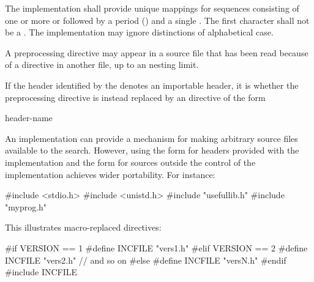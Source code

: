 \documentclass{wg21}
\newcommand{\clb}[1]{\removed{#1} \added{\grammarterm{line-break}}}
\begin{document}
\pnum
The implementation shall provide unique mappings for
sequences consisting of one or more
 or 
followed by a period
()
and a single
.
The first character shall not be a .
The implementation may ignore distinctions of alphabetical case.

\pnum
A
preprocessing directive may appear
in a source file that has been read because of a
directive in another file,
up to an  nesting limit.

\pnum
If the header identified by the 
denotes an importable header,
it is
whether the  preprocessing directive
is instead replaced by an  directive of the form
\begin{ncbnf}
     header-name \terminal{;} \clb{new-line}
\end{ncbnf}

\pnum
\begin{note}
    An implementation can provide a mechanism for making arbitrary
    source files available to the \tcode{< >} search.
    However, using the \tcode{< >} form for headers provided
    with the implementation and the  form for sources
    outside the control of the implementation
    achieves wider portability. For instance:
    
    \begin{codeblock}
        #include <stdio.h>
        #include <unistd.h>
        #include "usefullib.h"
        #include "myprog.h"
    \end{codeblock}
    
\end{note}

\pnum
\begin{example}
    This illustrates macro-replaced
    directives:
    
    \begin{codeblock}
        #if VERSION == 1
        #define INCFILE  "vers1.h"
        #elif VERSION == 2
        #define INCFILE  "vers2.h"  // and so on
        #else
        #define INCFILE  "versN.h"
        #endif
        #include INCFILE
    \end{codeblock}
\end{example}
\end{document}
